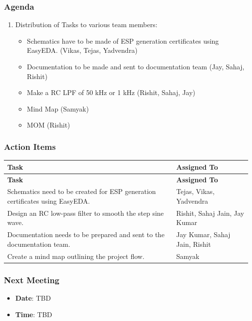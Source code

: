 \documentclass[12pt,a4paper]{article}
\begin{document}
\subsubsection*{Agenda}
\begin{enumerate}
    \item Distribution of Tasks to various team members:
    \begin{itemize}
        \item Schematics have to be made of ESP generation certificates using EasyEDA. (Vikas, Tejas, Yadvendra)
        \item Documentation to be made and sent to documentation team (Jay, Sahaj, Rishit)
        \item Make a RC LPF of 50 kHz or 1 kHz (Rishit, Sahaj, Jay)
        \item Mind Map (Samyak)
        \item MOM (Rishit)
    \end{itemize}
\end{enumerate}

\subsubsection*{Action Items}
\begin{longtable}{| p{8cm} | p{6cm} |}
\hline
\textbf{Task} & \textbf{Assigned To} \\
\hline
\endfirsthead
\hline
\textbf{Task} & \textbf{Assigned To} \\
\hline
\endhead
\hline
Schematics need to be created for ESP generation certificates using EasyEDA. & Tejas, Vikas, Yadvendra \\
\hline
Design an RC low-pass filter to smooth the step sine wave. & Rishit, Sahaj Jain, Jay Kumar \\
\hline
Documentation needs to be prepared and sent to the documentation team. & Jay Kumar, Sahaj Jain, Rishit \\
\hline
Create a mind map outlining the project flow. & Samyak \\
\hline
\end{longtable}

\subsubsection*{Next Meeting}
\begin{itemize}
    \item \textbf{Date}: TBD
    \item \textbf{Time}: TBD
\end{itemize}
\end{document}
